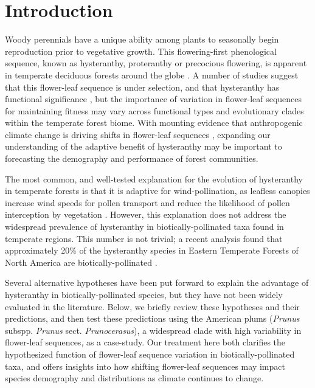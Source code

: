 \documentclass{article}[12pt]
\begin{document}
\pagebreak
\section*{Introduction}
\noindent Woody perennials have a unique ability among plants to seasonally begin reproduction prior to vegetative growth. This flowering-first phenological sequence, known as hysteranthy, proteranthy or precocious flowering, is apparent in temperate deciduous forests around the globe \citep{Rathcke_1985}. A number of studies suggest that this flower-leaf sequence is under selection, and that hysteranthy has functional significance \citep{Gougherty2018,Buonaiuto2020,Guo2014}, but the importance of variation in flower-leaf sequences for maintaining fitness may vary across functional types and evolutionary clades within the temperate forest biome. With mounting evidence that anthropogenic climate change is driving shifts in flower-leaf sequences \citep{Ma:2021tf,Wang:2022wt}, expanding our understanding of the adaptive benefit of hysteranthy may be important to forecasting the demography and performance of forest communities.

\noindent The most common, and well-tested explanation for the evolution of hysteranthy in temperate forests is that it is adaptive for wind-pollination, as leafless canopies increase wind speeds for pollen transport and reduce the likelihood of pollen interception by vegetation \citep{Whitehead1969,Niklas1985}. However, this explanation does not address the widespread prevalence of hysteranthy in biotically-pollinated taxa found in temperate regions. This number is not trivial; a recent analysis found that approximately 20\% of the hysteranthy species in Eastern Temperate Forests of North America are biotically-pollinated \citep{Buonaiuto2020}. 

Several alternative hypotheses have been put forward to explain the advantage of hysteranthy in biotically-pollinated species, but they have not been widely evaluated in the literature. Below, we briefly review these hypotheses and their predictions, and then test these predictions using the American plums (\textit{Prunus} subspp. \textit{Prunus} sect. \textit{Prunocerasus}), a widespread clade with high variability in flower-leaf sequences, as a case-study. Our treatment here both clarifies the hypothesized function of flower-leaf sequence variation in biotically-pollinated taxa, and offers insights into how shifting flower-leaf sequences may impact species demography and distributions as climate continues to change.
\end{document}
